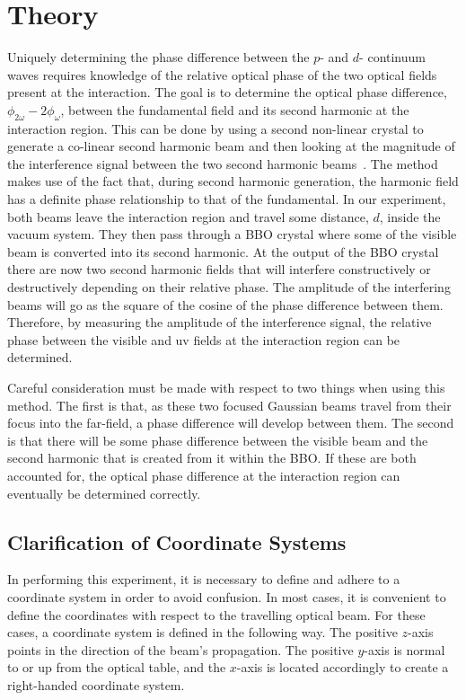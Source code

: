 \chapter{Theory}

Uniquely determining the phase difference between the $p$- and
$d$- continuum waves requires knowledge of the relative optical
phase of the two optical fields present at the interaction.  The
goal is to determine the optical phase difference, $\phi_{2
\omega} - 2\phi_{\omega}$, between the fundamental field and its
second harmonic at the interaction region.  This can be done by
using a second non-linear crystal to generate a co-linear second
harmonic beam and then looking at the magnitude of the
interference signal between the two second harmonic
beams~\cite{Chudinov}. The method makes use of the fact that,
during second harmonic generation, the harmonic field has a
definite phase relationship to that of the fundamental.  In our
experiment, both beams leave the interaction region and travel
some distance, $d$, inside the vacuum system. They then pass
through a BBO crystal where some of the visible beam is converted
into its second harmonic. At the output of the BBO crystal there
are now two second harmonic fields that will interfere
constructively or destructively depending on their relative phase.
The amplitude of the interfering beams will go as the square of
the cosine of the phase difference between them.  Therefore, by
measuring the amplitude of the interference signal, the relative
phase between the visible and uv fields at the interaction region
can be determined.

Careful consideration must be made with respect to two things when
using this method.  The first is that, as these two focused
Gaussian beams travel from their focus into the far-field, a phase
difference will develop between them.  The second is that there
will be some phase difference between the visible beam and the
second harmonic that is created from it within the BBO.  If these
are both accounted for, the optical phase difference at the
interaction region can eventually be determined correctly.


\section{Clarification of Coordinate Systems}

In performing this experiment, it is necessary to define and
adhere to a coordinate system in order to avoid confusion.  In
most cases, it is convenient to define the coordinates with
respect to the travelling optical beam.  For these cases, a
coordinate system is defined in the following way. The positive
$z$-axis points in the direction of the beam's propagation. The
positive $y$-axis is normal to or up from the optical table, and
the $x$-axis is located accordingly to create a right-handed
coordinate system.

